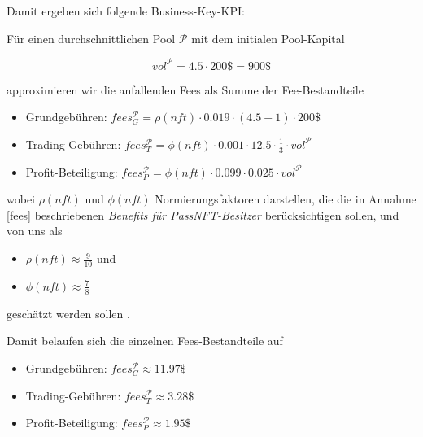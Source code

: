 Damit ergeben sich folgende Business-Key-KPI:

\vspace{0.3cm}

\begin{Fazit}

\vspace{0.75cm}


\vspace{0.75cm}

Für einen durchschnittlichen Pool $\mathcal{P}$ mit dem initialen Pool-Kapital

\begin{equation*}
  vol^{\mathcal{P}} = 4.5 \cdot 200\$ = 900\$ 
\end{equation*}

approximieren wir die anfallenden Fees als Summe der Fee-Bestandteile

\begin{itemize}
	\item Grundgebühren: $fees_{G}^{\mathcal{P}} = \rho(nft) \cdot 0.019 \cdot (4.5 - 1) \cdot 200\$ $
	\item Trading-Gebühren: $fees_{T}^{\mathcal{P}} = \phi(nft) \cdot 0.001 \cdot 12.5 \cdot \frac{1}{3} \cdot vol^{\mathcal{P}} $
	\item Profit-Beteiligung: $fees_{P}^{\mathcal{P}} = \phi(nft) \cdot 0.099 \cdot 0.025 \cdot vol^{\mathcal{P}} $
\end{itemize}

wobei $\rho(nft)$ und $\phi(nft)$ Normierungsfaktoren darstellen, die die in Annahme \ref{fees} beschriebenen \textit{Benefits für PassNFT-Besitzer} berücksichtigen sollen, und von uns als 

\begin{itemize}
	\item $\rho(nft) \approx \frac{9}{10}$ und 
	\item $\phi(nft) \approx \frac{7}{8}$
\end{itemize}	

geschätzt werden sollen .

\vspace{0.2cm}

Damit belaufen sich die einzelnen Fees-Bestandteile auf 

\begin{itemize}
	\item Grundgebühren: $fees_{G}^{\mathcal{P}} \approx 11.97\$ $
	\item Trading-Gebühren: $fees_{T}^{\mathcal{P}} \approx 3.28 \$ $
	\item Profit-Beteiligung: $fees_{P}^{\mathcal{P}} \approx 1.95 \$ $
\end{itemize}


\end{Fazit}
